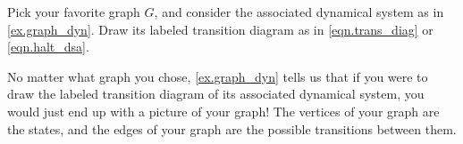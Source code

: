 \documentclass[Book-Poly]{subfiles}
\begin{document}
\begin{exercise}
Pick your favorite graph $G$, and consider the associated dynamical system as in \cref{ex.graph_dyn}.
Draw its labeled transition diagram as in \eqref{eqn.trans_diag} or \eqref{eqn.halt_dsa}.
\begin{solution}
No matter what graph you chose, \cref{ex.graph_dyn} tells us that if you were to draw the labeled transition diagram of its associated dynamical system, you would just end up with a picture of your graph!
The vertices of your graph are the states, and the edges of your graph are the possible transitions between them.
\end{solution}
\end{exercise}



\end{document}
